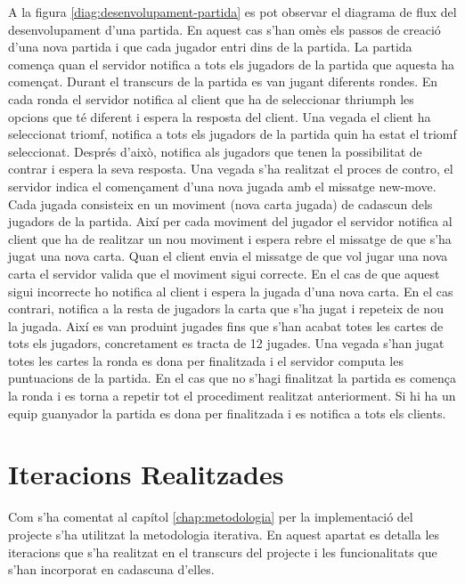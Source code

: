 A la figura \ref{diag:desenvolupament-partida} es pot observar el diagrama de flux del desenvolupament d'una partida. En aquest cas s'han omès els passos de creació d'una nova partida i que cada jugador entri dins de la partida. La partida comença quan el servidor notifica a tots els jugadors de la partida que aquesta ha començat. Durant el transcurs de la partida es van jugant diferents rondes. En cada ronda el servidor notifica al client que ha de seleccionar thriumph les opcions que té diferent i espera la resposta del client. Una vegada el client ha seleccionat triomf, notifica a tots els jugadors de la partida quin ha estat el triomf seleccionat. Després d'això, notifica als jugadors que tenen la possibilitat de contrar i espera la seva resposta. Una vegada s'ha realitzat el proces de contro, el servidor indica el començament d'una nova jugada amb el missatge new-move. Cada jugada consisteix en un moviment (nova carta jugada) de cadascun dels jugadors de la partida. Així per cada moviment del jugador el servidor notifica al client que ha de realitzar un nou moviment i espera rebre el missatge de que s'ha jugat una nova carta. Quan el client envia el missatge de que vol jugar una nova carta el servidor valida que el moviment sigui correcte. En el cas de que aquest sigui incorrecte ho notifica al client i espera la jugada d'una nova carta. En el cas contrari, notifica a la resta de jugadors la carta que s'ha jugat i repeteix de nou la jugada. Així es van produint jugades fins que s'han acabat totes les cartes de tots els jugadors, concretament es tracta de 12 jugades. Una vegada s'han jugat totes les cartes la ronda es dona per finalitzada i el servidor computa les puntuacions de la partida. En el cas que no s'hagi finalitzat la partida es comença la ronda i es torna a repetir tot el procediment realitzat anteriorment. Si hi ha un equip guanyador la partida es dona per finalitzada i es notifica a tots els clients. 


\section{Iteracions Realitzades}

Com s'ha comentat al capítol \ref{chap:metodologia} per la implementació del projecte s'ha utilitzat la metodologia iterativa. En aquest apartat es detalla les iteracions que s'ha realitzat en el transcurs del projecte i les funcionalitats que s'han incorporat en cadascuna d'elles. 

